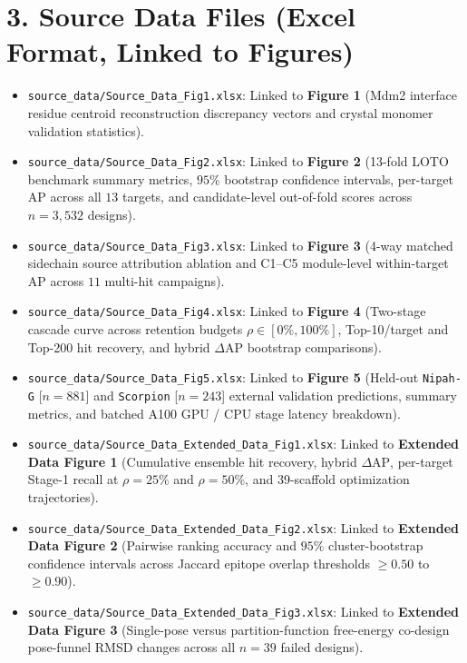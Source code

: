 \documentclass[11pt]{article}
\begin{document}
\section*{3. Source Data Files (Excel Format, Linked to Figures)}
\begin{itemize}
    \item \texttt{source\_data/Source\_Data\_Fig1.xlsx}: Linked to \textbf{Figure 1} (Mdm2 interface residue centroid reconstruction discrepancy vectors and crystal monomer validation statistics).
    \item \texttt{source\_data/Source\_Data\_Fig2.xlsx}: Linked to \textbf{Figure 2} (13-fold LOTO benchmark summary metrics, $95\%$ bootstrap confidence intervals, per-target AP across all $13$ targets, and candidate-level out-of-fold scores across $n = 3,532$ designs).
    \item \texttt{source\_data/Source\_Data\_Fig3.xlsx}: Linked to \textbf{Figure 3} (4-way matched sidechain source attribution ablation and C1--C5 module-level within-target AP across $11$ multi-hit campaigns).
    \item \texttt{source\_data/Source\_Data\_Fig4.xlsx}: Linked to \textbf{Figure 4} (Two-stage cascade curve across retention budgets $\rho \in [0\%, 100\%]$, Top-10/target and Top-200 hit recovery, and hybrid $\Delta\text{AP}$ bootstrap comparisons).
    \item \texttt{source\_data/Source\_Data\_Fig5.xlsx}: Linked to \textbf{Figure 5} (Held-out \texttt{Nipah-G} [$n=881$] and \texttt{Scorpion} [$n=243$] external validation predictions, summary metrics, and batched A100 GPU / CPU stage latency breakdown).
    \item \texttt{source\_data/Source\_Data\_Extended\_Data\_Fig1.xlsx}: Linked to \textbf{Extended Data Figure 1} (Cumulative ensemble hit recovery, hybrid $\Delta\text{AP}$, per-target Stage-1 recall at $\rho = 25\%$ and $\rho = 50\%$, and 39-scaffold optimization trajectories).
    \item \texttt{source\_data/Source\_Data\_Extended\_Data\_Fig2.xlsx}: Linked to \textbf{Extended Data Figure 2} (Pairwise ranking accuracy and $95\%$ cluster-bootstrap confidence intervals across Jaccard epitope overlap thresholds $\ge 0.50$ to $\ge 0.90$).
    \item \texttt{source\_data/Source\_Data\_Extended\_Data\_Fig3.xlsx}: Linked to \textbf{Extended Data Figure 3} (Single-pose versus partition-function free-energy co-design pose-funnel RMSD changes across all $n = 39$ failed designs).
\end{itemize}
\end{document}
